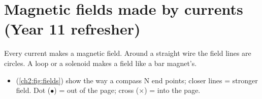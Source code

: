 \section{Magnetic fields made by currents (Year 11 refresher)}\label{ch2:sec:fields}

\begin{bigidea}
Every current makes a magnetic field. Around a straight wire the field lines are circles. A loop
or a solenoid makes a field like a bar magnet's.
\end{bigidea}

\begin{keywords}
\end{keywords}

\begin{itemize}
  \item {} (\cref{ch2:fig:fields}) show the way a compass N end points; closer
        lines = stronger field. Dot ($\bullet$) = out of the page; cross ($\times$) = into the page.
\end{itemize}

